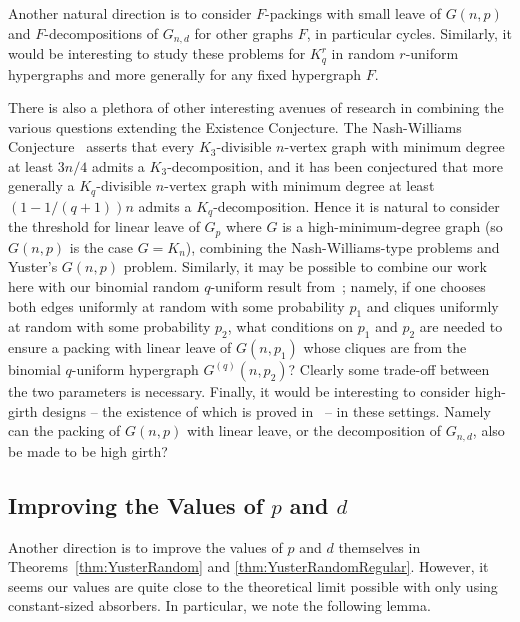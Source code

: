 \documentclass[11pt]{article}
\numberwithin{equation}{section}
\newcounter{i}
\theoremstyle{plain}
\theoremstyle{plain} %
\theoremstyle{definition}
\begin{document}
Another natural direction is to consider $F$-packings with small leave of $G(n,p)$ and $F$-decompositions of $G_{n,d}$ for other graphs $F$, in particular cycles. Similarly, it would be interesting to study these problems for $K_q^r$ in random $r$-uniform hypergraphs and more generally for any fixed hypergraph $F$.


There is also a plethora of other interesting avenues of research in combining the various questions extending the Existence Conjecture.
The Nash-Williams Conjecture~\cite{N-W70} asserts that every $K_3$-divisible $n$-vertex graph with minimum degree at least $3n/4$ admits a $K_3$-decomposition, and it has been conjectured \cite{Gu91, BKLO16} that more generally a $K_q$-divisible $n$-vertex graph with minimum degree at least $(1 - 1/(q + 1))n$ admits a $K_q$-decomposition.  
Hence it is natural to consider the threshold for linear leave of $G_p$ where $G$ is a high-minimum-degree graph (so $G(n,p)$ is the case $G=K_n$), combining the Nash-Williams-type problems and Yuster's $G(n,p)$ problem. 
Similarly, it may be possible to combine our work here with our binomial random $q$-uniform result from~\cite{DKPIV}; namely, if one chooses both edges uniformly at random with some probability $p_1$ and cliques uniformly at random with some probability $p_2$, what conditions on $p_1$ and $p_2$ are needed to ensure a packing with linear leave of $G(n,p_1)$ whose cliques are from the binomial $q$-uniform hypergraph $G^{(q)}(n,p_2)$? Clearly some trade-off between the two parameters is necessary.
Finally, it would be interesting to consider high-girth designs -- the existence of which is proved in~\cite{DPII} -- in these settings.  Namely can the packing of $G(n,p)$ with linear leave, or the decomposition of $G_{n,d}$, also be made to be high girth?

\subsection{Improving the Values of $p$ and $d$}

Another direction is to improve the values of $p$ and $d$ themselves in Theorems~\ref{thm:YusterRandom} and \ref{thm:YusterRandomRegular}. However, it seems our values are quite close to the theoretical limit possible with only using constant-sized absorbers. In particular, we note the following lemma.

\end{document}

